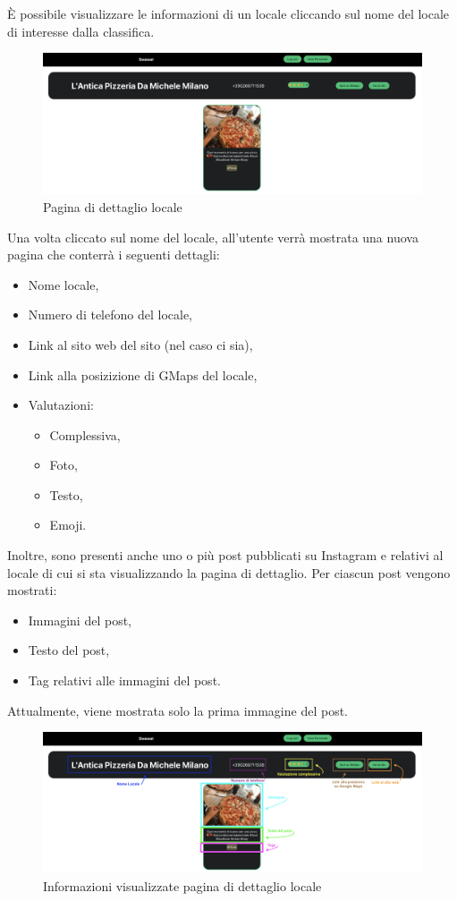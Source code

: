 
È possibile visualizzare le informazioni di un locale cliccando sul nome del locale di interesse dalla classifica.

\begin{figure}[H]
\centering
\includegraphics[scale=0.3]{./images/DettagliLocale/DettagliLocale.png} 
\caption{Pagina di dettaglio locale}
\end{figure}

Una volta cliccato sul nome del locale, all’utente verrà mostrata una nuova pagina che conterrà i seguenti dettagli:

\begin{itemize}
\item Nome locale,
\item Numero di telefono del locale,
\item Link al sito web del sito (nel caso ci sia),
\item Link alla posizizione di GMaps del locale,
\item Valutazioni:
\begin{itemize}
\item Complessiva,
\item Foto, 
\item Testo,
\item Emoji.
\end{itemize}
\end{itemize}

Inoltre, sono presenti anche uno o più post pubblicati su Instagram e relativi al locale di cui si sta visualizzando la pagina di dettaglio.
Per ciascun post vengono mostrati:

\begin{itemize}
\item Immagini del post,
\item Testo del post,
\item Tag relativi alle immagini del post.
\end{itemize}

Attualmente, viene mostrata solo la prima immagine del post.

\begin{figure}[H]
\centering
\includegraphics[scale=0.3]{./images/DettagliLocale/DettagliLocale2.png} 
\caption{Informazioni visualizzate pagina di dettaglio locale}
\end{figure}